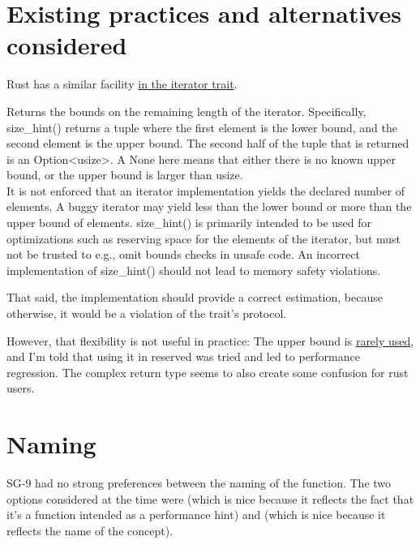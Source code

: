 \documentclass{wg21}
\begin{document}
\section{Existing practices and alternatives considered}

Rust has a similar facility \href{https://doc.rust-lang.org/std/iter/trait.Iterator.html#method.size_hint}{in the iterator trait}.

\begin{quoteblock}
\textbf{}


Returns the bounds on the remaining length of the iterator.
Specifically, size_hint() returns a tuple where the first element is the lower bound, and the second element is the upper bound.
The second half of the tuple that is returned is an Option<usize>. A None here means that either there is no known upper bound, or the upper bound is larger than usize.\\

It is not enforced that an iterator implementation yields the declared number of elements. A buggy iterator may yield less than the lower bound or more than the upper bound of elements.
size_hint() is primarily intended to be used for optimizations such as reserving space for the elements of the iterator, but must not be trusted to e.g., omit bounds checks in unsafe code. An incorrect implementation of size_hint() should not lead to memory safety violations.

That said, the implementation should provide a correct estimation, because otherwise, it would be a violation of the trait’s protocol.
\end{quoteblock}

However, that flexibility is not useful in practice:
The upper bound is \href{https://internals.rust-lang.org/t/is-size-hint-1-ever-used/8187?u=scottmcm}{rarely used},
and I'm told that using it in reserved was tried and led to performance regression.
The complex return type seems to also create some confusion for rust users.


\section{Naming}


SG-9 had no strong preferences between the naming of the  function.
The two options considered at the time were  (which is nice because it reflects the fact that it's a function intended as a performance hint)
and  (which is nice because it reflects the name of the  concept).
\end{document}

